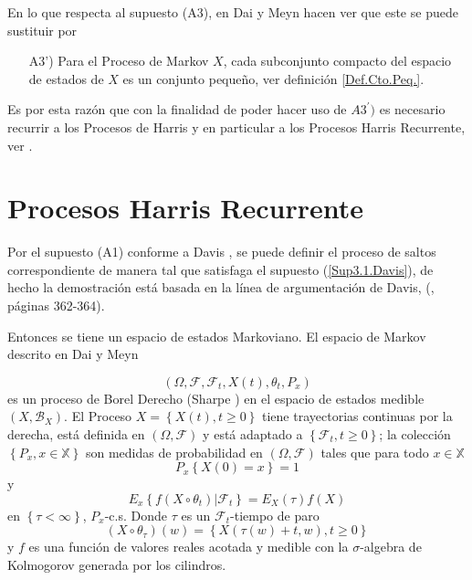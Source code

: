 \documentclass{article}
\begin{document}
En lo que respecta al supuesto (A3), en Dai y Meyn \cite{DaiSean} hacen ver que este se puede sustituir por

\begin{itemize}
\item[A3')] Para el Proceso de Markov $X$, cada subconjunto compacto del espacio de estados de $X$ es un conjunto peque\~no, ver definici\'on \ref{Def.Cto.Peq.}.
\end{itemize}

Es por esta raz\'on que con la finalidad de poder hacer uso de $A3^{'})$ es necesario recurrir a los Procesos de Harris y en particular a los Procesos Harris Recurrente, ver \cite{Dai, DaiSean}.

\section{Procesos Harris Recurrente}

Por el supuesto (A1) conforme a Davis \cite{Davis}, se puede definir el proceso de saltos correspondiente de manera tal que satisfaga el supuesto (\ref{Sup3.1.Davis}), de hecho la demostraci\'on est\'a basada en la l\'inea de argumentaci\'on de Davis, (\cite{Davis}, p\'aginas 362-364).

Entonces se tiene un espacio de estados Markoviano. El espacio de Markov descrito en Dai y Meyn \cite{DaiSean}

\[\left(\Omega,\mathcal{F},\mathcal{F}_{t},X\left(t\right),\theta_{t},P_{x}\right)\] es un proceso de Borel Derecho (Sharpe \cite{Sharpe}) en el espacio de estados medible $\left(X,\mathcal{B}_{X}\right)$. El Proceso $X=\left\{X\left(t\right),t\geq0\right\}$ tiene trayectorias continuas por la derecha, est\'a definida en $\left(\Omega,\mathcal{F}\right)$ y est\'a adaptado a $\left\{\mathcal{F}_{t},t\geq0\right\}$; la colecci\'on $\left\{P_{x},x\in \mathbb{X}\right\}$ son medidas de probabilidad en $\left(\Omega,\mathcal{F}\right)$ tales que para todo $x\in \mathbb{X}$ \[P_{x}\left\{X\left(0\right)=x\right\}=1\] y \[E_{x}\left\{f\left(X\circ\theta_{t}\right)|\mathcal{F}_{t}\right\}=E_{X}\left(\tau\right)f\left(X\right)\] en $\left\{\tau<\infty\right\}$, $P_{x}$-c.s. Donde $\tau$ es un $\mathcal{F}_{t}$-tiempo de paro \[\left(X\circ\theta_{\tau}\right)\left(w\right)=\left\{X\left(\tau\left(w\right)+t,w\right),t\geq0\right\}\] y $f$ es una funci\'on de valores reales acotada y medible con la $\sigma$-algebra de Kolmogorov generada por los cilindros.\\
\end{document}
